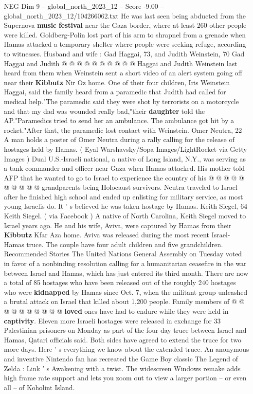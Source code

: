 \begin{textsample}{NEG Dim 9 – global\_north\_2023\_12 – Score -9.00 – global\_north\_2023\_12/104266062.txt}
He was last seen being abducted from the Supernova \textbf{music} \textbf{festival} near the Gaza border, where at least 260 other people were killed.
Goldberg-Polin lost part of his arm to shrapnel from a grenade when Hamas attacked a temporary shelter where people were seeking refuge, according to witnesses.
Husband and wife : Gad Haggai, 73, and Judith Weinstein, 70 Gad Haggai and Judith @ @ @ @ @ @ @ @ @ @ Haggai and Judith Weinstein last heard from them when Weinstein sent a short video of an alert system going off near their \textbf{Kibbutz} Nir Oz home.
One of their four children, Iris Weinstein Haggai, said the family heard from a paramedic that Judith had called for medical help."The paramedic said they were shot by terrorists on a motorcycle and that my dad was wounded really bad,"their \textbf{daughter} told the AP."Paramedics tried to send her an ambulance.
The ambulance got hit by a rocket."After that, the paramedic lost contact with Weinstein.
Omer Neutra, 22 A man holds a poster of Omer Neutra during a rally calling for the release of hostages held by Hamas. ( Eyal Warshavsky/Sopa Images/LightRocket via Getty Images ) Dual U.S.-Israeli national, a native of Long Island, N.Y., was serving as a tank commander and officer near Gaza when Hamas attacked.
His mother told AFP that he wanted to go to Israel to experience the country of his @ @ @ @ @ @ @ @ @ @ grandparents being Holocaust survivors.
Neutra traveled to Israel after he finished high school and ended up enlisting for military service, as most young Israelis do.
It ' s believed he was taken hostage by Hamas.
Keith Siegel, 64 Keith Siegel. ( via Facebook ) A native of North Carolina, Keith Siegel moved to Israel years ago.
He and his wife, Aviva, were captured by Hamas from their \textbf{Kibbutz} Kfar Aza home.
Aviva was released during the most recent Israel-Hamas truce.
The couple have four adult children and five grandchildren.
Recommended Stories The United Nations General Assembly on Tuesday voted in favor of a nonbinding resolution calling for a humanitarian ceasefire in the war between Israel and Hamas, which has just entered its third month.
There are now a total of 85 hostages who have been released out of the roughly 240 hostages who were \textbf{kidnapped} by Hamas since Oct. 7, when the militant group unleashed a brutal attack on Israel that killed about 1,200 people.
Family members of @ @ @ @ @ @ @ @ @ @ \textbf{loved} ones have had to endure while they were held in \textbf{captivity}.
Eleven more Israeli hostages were released in exchange for 33 Palestinian prisoners on Monday as part of the four-day truce between Israel and Hamas, Qatari officials said.
Both sides have agreed to extend the truce for two more days.
Here ' s everything we know about the extended truce.
An anonymous and inventive Nintendo fan has recreated the Game Boy classic The Legend of Zelda : Link ' s Awakening with a twist.
The widescreen Windows remake adds high frame rate support and lets you zoom out to view a larger portion -- or even all -- of Koholint Island.

\end{textsample}
